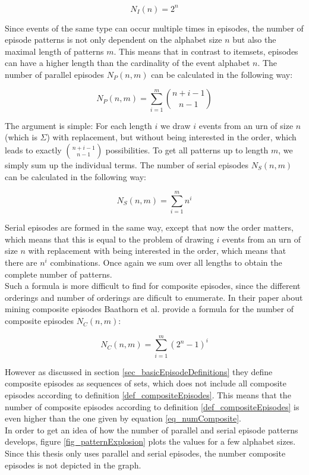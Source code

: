\begin{equation}
	N_I(n) = 2^n
\end{equation}

Since events of the same type can occur multiple times in episodes, the number of episode patterns is not only dependent on the alphabet size $n$ but also the maximal length of patterns $m$. This means that in contrast to itemsets, episodes can have a higher length than the cardinality of the event alphabet $n$. The number of parallel episodes $N_P(n,m)$ can be calculated in the following way:

\begin{equation}
	N_P(n,m) = \sum_{i=1}^m {{n+i-1}\choose{n-1}}
\end{equation}

The argument is simple: For each length $i$ we draw $i$ events from an urn of size $n$ (which is $\Sigma$) with replacement, but without being interested in the order, which leads to exactly ${n+i-1}\choose{n-1}$ possibilities. To get all patterns up to length $m$, we simply sum up the individual terms. The number of serial episodes $N_S(n,m)$ can be calculated in the following way:

\begin{equation}
	N_S(n,m) = \sum_{i=1}^m n^i
\end{equation}

Serial episodes are formed in the same way, except that now the order matters, which means that this is equal to the problem of drawing $i$ events from an urn of size $n$ with replacement with being interested in the order, which means that there are $n^i$ combinations. Once again we sum over all lengths to obtain the complete number of patterns. \\
Such a formula is more difficult to find for composite episodes, since the different orderings and number of orderings are dificult to enumerate. In their paper about mining composite episodes Baathorn et al. \cite{bathoorn2007finding} provide a formula for the number of composite episodes $N_C(n,m)$:

\begin{equation}
\label{eq_numComposite}
	N_C(n,m) = \sum_{i=1}^m (2^n -1)^i
\end{equation}

However as discussed in section \ref{sec_basicEpisodeDefinitions} they define composite episodes as sequences of sets, which does not include all composite episodes according to definition \ref{def_compositeEpisodes}. This means that the number of composite episodes according to definition \ref{def_compositeEpisodes} is even higher than the one given by equation \ref{eq_numComposite}. \\
In order to get an idea of how the number of parallel and serial episode patterns develops, figure \ref{fig_patternExplosion} plots the values for a few alphabet sizes. Since this thesis only uses parallel and serial episodes, the number composite episodes is not depicted in the graph.

